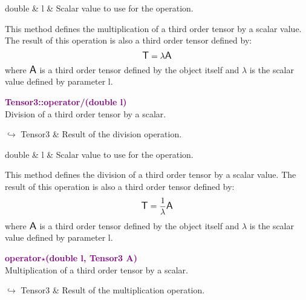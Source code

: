 \begin{tcolorbox}[width=\textwidth,myArgs,tabularx={ll|R}]
double & l & Scalar value to use for the operation.
\end{tcolorbox}

This method defines the multiplication of a third order tensor by a scalar value.
The result of this operation is also a third order tensor defined by:
\begin{equation*}
\mbox{\large\ensuremath{\mathsf{T}}} = \lambda \mbox{\large\ensuremath{\mathsf{A}}}
\end{equation*}
where $\mbox{\large\ensuremath{\mathsf{A}}}$ is a third order tensor defined by the object itself and $\lambda$ is the scalar value defined by parameter l.

\textcolor{purple}{\textbf{Tensor3::operator/(double l)}}\label{Tensor3::operator/(double l)}\\
Division of a third order tensor by a scalar.\vspace*{-0.5em}
\begin{tcolorbox}[grow to left by=-1cm, width=\textwidth-1cm,myArgs,tabularx={l|R}]
$\hookrightarrow$ Tensor3 & Result of the division operation.
\end{tcolorbox}

\begin{tcolorbox}[width=\textwidth,myArgs,tabularx={ll|R}]
double & l & Scalar value to use for the operation.
\end{tcolorbox}

This method defines the division of a third order tensor by a scalar value.
The result of this operation is also a third order tensor defined by:
\begin{equation*}
\mbox{\large\ensuremath{\mathsf{T}}} = \frac{1}{\lambda} \mbox{\large\ensuremath{\mathsf{A}}}
\end{equation*}
where $\mbox{\large\ensuremath{\mathsf{A}}}$ is a third order tensor defined by the object itself and $\lambda$ is the scalar value defined by parameter l.

\textcolor{purple}{\textbf{operator$\star$(double l, Tensor3 A)}}\label{operator*(double l, Tensor3 A)}\\
Multiplication of a third order tensor by a scalar.\vspace*{-0.5em}
\begin{tcolorbox}[grow to left by=-1cm, width=\textwidth-1cm,myArgs,tabularx={l|R}]
$\hookrightarrow$ Tensor3 & Result of the multiplication operation.
\end{tcolorbox}

